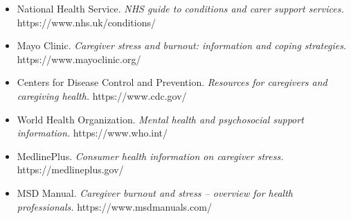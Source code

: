 \begin{itemize}
    \item National Health Service. \textit{NHS guide to conditions and carer support services.} https://www.nhs.uk/conditions/
    \item Mayo Clinic. \textit{Caregiver stress and burnout: information and coping strategies.} https://www.mayoclinic.org/
    \item Centers for Disease Control and Prevention. \textit{Resources for caregivers and caregiving health.} https://www.cdc.gov/
    \item World Health Organization. \textit{Mental health and psychosocial support information.} https://www.who.int/
    \item MedlinePlus. \textit{Consumer health information on caregiver stress.} https://medlineplus.gov/
    \item MSD Manual. \textit{Caregiver burnout and stress -- overview for health professionals.} https://www.msdmanuals.com/
\end{itemize}
